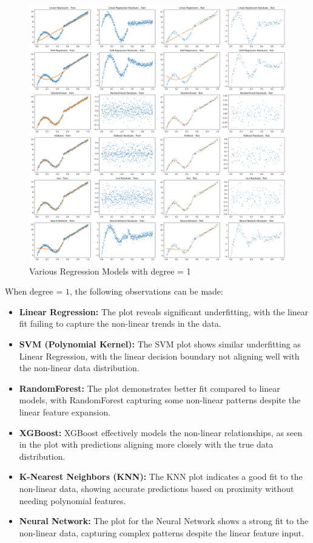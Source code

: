 \begin{figure}[H]
	\centering
	\includegraphics[width=0.8\linewidth]{./Images/E3-MLR3-1.png}
	\caption{Various Regression Models with degree = 1}
\end{figure}

When degree = $1$, the following observations can be made:

\begin{itemize}
    \item \textbf{Linear Regression:} The plot reveals significant underfitting, with the linear fit failing to capture the non-linear trends in the data.
    \item \textbf{SVM (Polynomial Kernel):} The SVM plot shows similar underfitting as Linear Regression, with the linear decision boundary not aligning well with the non-linear data distribution.
    \item \textbf{RandomForest:} The plot demonstrates better fit compared to linear models, with RandomForest capturing some non-linear patterns despite the linear feature expansion.
    \item \textbf{XGBoost:} XGBoost effectively models the non-linear relationships, as seen in the plot with predictions aligning more closely with the true data distribution.
    \item \textbf{K-Nearest Neighbors (KNN):} The KNN plot indicates a good fit to the non-linear data, showing accurate predictions based on proximity without needing polynomial features.
    \item \textbf{Neural Network:} The plot for the Neural Network shows a strong fit to the non-linear data, capturing complex patterns despite the linear feature input.
\end{itemize}

